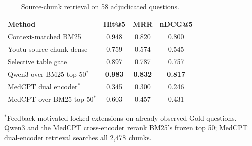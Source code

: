 \begin{table}[t]
\centering
\begin{threeparttable}
\caption{Source-chunk retrieval on 58 adjudicated questions.}
\label{tab:final58}
\begin{tabular}{lccc}
\toprule
Method & Hit@5 & MRR & nDCG@5 \\
\midrule
Context-matched BM25 & 0.948 & 0.820 & 0.800 \\
Youtu source-chunk dense & 0.759 & 0.574 & 0.545 \\
Selective table gate & 0.897 & 0.787 & 0.757 \\
Qwen3 over BM25 top 50$^{*}$ & \textbf{0.983} & \textbf{0.832} & \textbf{0.817} \\
MedCPT dual encoder$^{*}$ & 0.345 & 0.300 & 0.246 \\
MedCPT over BM25 top 50$^{*}$ & 0.603 & 0.457 & 0.431 \\
\bottomrule
\end{tabular}
\begin{tablenotes}[flushleft]\footnotesize
\item $^{*}$Feedback-motivated locked extensions on already observed Gold questions. Qwen3 and the MedCPT cross-encoder rerank BM25's frozen top 50; MedCPT dual-encoder retrieval searches all 2,478 chunks.
\end{tablenotes}
\end{threeparttable}
\end{table}
